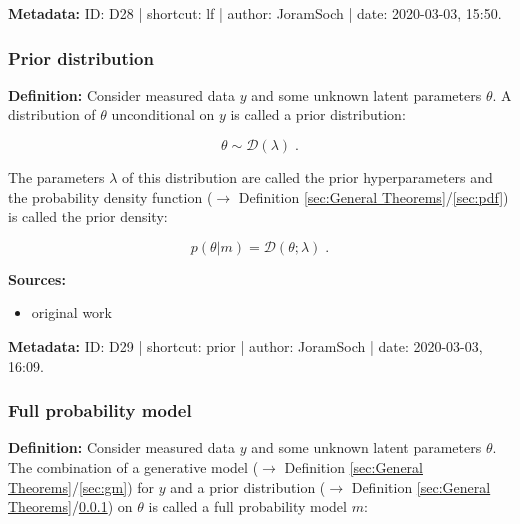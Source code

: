\documentclass[a4paper,12pt,twoside]{book}
\begin{document}
\vspace{1em}
\textbf{Metadata:} ID: D28 | shortcut: lf | author: JoramSoch | date: 2020-03-03, 15:50.
\vspace{1em}



\subsubsection[\textit{Prior distribution}]{Prior distribution} \label{sec:prior}
\setcounter{equation}{0}

\textbf{Definition:} Consider measured data $y$ and some unknown latent parameters $\theta$. A distribution of $\theta$ unconditional on $y$ is called a prior distribution:

\begin{equation} \label{eq:prior-prior}
\theta \sim \mathcal{D}(\lambda) \; .
\end{equation}

The parameters $\lambda$ of this distribution are called the prior hyperparameters and the probability density function ($\rightarrow$ Definition \ref{sec:General Theorems}/\ref{sec:pdf}) is called the prior density:

\begin{equation} \label{eq:prior-prior-pdf}
p(\theta|m) = \mathcal{D}(\theta; \lambda) \; .
\end{equation}


\vspace{1em}
\textbf{Sources:}
\begin{itemize}
\item original work\end{itemize}


\vspace{1em}
\textbf{Metadata:} ID: D29 | shortcut: prior | author: JoramSoch | date: 2020-03-03, 16:09.
\vspace{1em}



\subsubsection[\textit{Full probability model}]{Full probability model} \label{sec:fpm}
\setcounter{equation}{0}

\textbf{Definition:} Consider measured data $y$ and some unknown latent parameters $\theta$. The combination of a generative model ($\rightarrow$ Definition \ref{sec:General Theorems}/\ref{sec:gm}) for $y$ and a prior distribution ($\rightarrow$ Definition \ref{sec:General Theorems}/\ref{sec:prior}) on $\theta$ is called a full probability model $m$:
\end{document}
